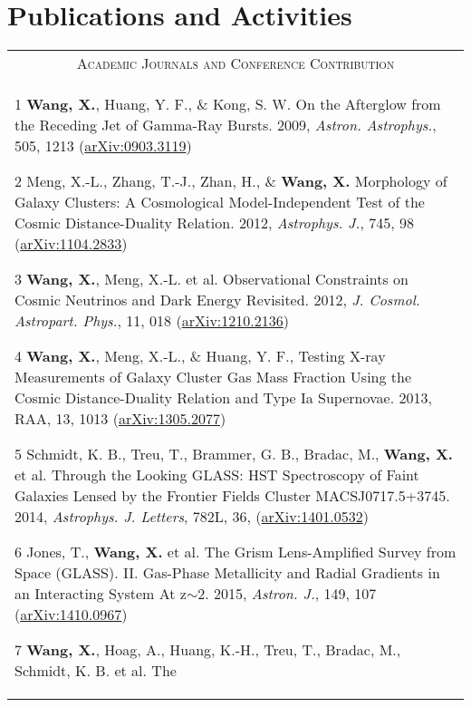 \documentclass[10pt]{article}
\begin{document}
\section{Publications and Activities}
\begin{longtable}{p{17cm}}
\multicolumn{1}{c}{\textsc{Academic Journals and Conference Contribution}}      \\
\vspace{-0.3cm}
\begin{list}{}{\leftmargin=0.5em}
    \item[1]\hypertarget{09.wang.aa}{} \textbf{Wang, X.}, Huang, Y. F., \& Kong, S. W. On the Afterglow from the Receding Jet of Gamma-Ray Bursts. 2009, \textit{Astron. Astrophys.}, 505, 1213 (\href{http://arxiv.org/abs/0903.3119}{arXiv:0903.3119})
    \item[2]\hypertarget{12.meng.apj}{} Meng, X.-L., Zhang, T.-J., Zhan, H., \& \textbf{Wang, X.} Morphology of Galaxy Clusters: A Cosmological Model-Independent Test of the Cosmic Distance-Duality Relation. 2012, \textit{Astrophys. J.}, 745, 98 (\href{http://arxiv.org/abs/1104.2833}{arXiv:1104.2833})
    \item[3]\hypertarget{12.wang.jcap}{} \textbf{Wang, X.}, Meng, X.-L. et al. Observational Constraints on Cosmic Neutrinos and Dark Energy Revisited. 2012, \textit{J. Cosmol. Astropart. Phys.}, 11, 018 (\href{http://arxiv.org/abs/1210.2136}{arXiv:1210.2136})
    \item[4]\hypertarget{13.wang.raa}{} \textbf{Wang, X.}, Meng, X.-L., \& Huang, Y. F., Testing X-ray Measurements of Galaxy Cluster Gas
  Mass Fraction Using the Cosmic Distance-Duality Relation and Type Ia Supernovae. 2013, RAA, 13, 1013 (\href{http://arxiv.org/abs/1305.2077}{arXiv:1305.2077})
    \item[5]\hypertarget{14.schmidt.apjl}{} Schmidt, K. B., Treu, T., Brammer, G. B., Bradac, M., \textbf{Wang, X.} et al. Through
      the Looking GLASS: HST Spectroscopy of Faint Galaxies Lensed by the Frontier Fields Cluster MACSJ0717.5+3745. 2014,
      \textit{Astrophys. J. Letters}, 782L, 36, (\href{http://arxiv.org/abs/1401.0532}{arXiv:1401.0532})
    \item[6]\hypertarget{15.jones.aj}{} Jones, T., \textbf{Wang, X.} et al. The Grism Lens-Amplified Survey from Space (GLASS).
      II. Gas-Phase Metallicity and Radial Gradients in an Interacting System At z$\sim$2. 2015, \textit{Astron. J.}, 149, 107
      (\href{http://arxiv.org/abs/1410.0967}{arXiv:1410.0967})
    \item[7]\hypertarget{15.wang.apj}{} \textbf{Wang, X.}, Hoag, A., Huang, K.-H., Treu, T., Bradac, M., Schmidt, K. B. et al. The

\end{list}
\end{longtable}
\end{document}
